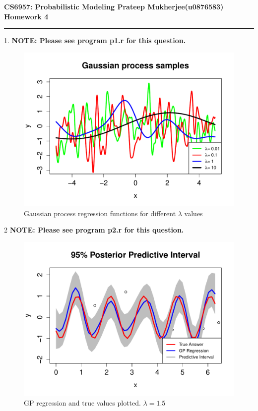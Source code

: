 \documentclass[11pt]{article}
\begin{document}
\thispagestyle{empty}
{\large{\bf CS6957: Probabilistic Modeling \hfill Prateep Mukherjee(u0876583)}}\\

{\LARGE{\bf Homework 4}}
\vspace{0.2\baselineskip}
\hrule

\par 1. \textbf{\large{NOTE: Please see program p1.r for this question.}}

\vspace{-5pt}

\begin{figure}[hbt!]
\centering
\includegraphics[width=0.8\linewidth]{p1.pdf}
\vspace{-25pt}
\caption{Gaussian process regression functions for different $\lambda$ values}
\label{fig1}
\end{figure}


\par 2 \textbf{\large{NOTE: Please see program p2.r for this question.}}

\vspace{-10pt}

\begin{figure}[hbt!]
\centering
\includegraphics[width=0.8\linewidth]{p2.pdf}
\vspace{-25pt}
\caption{GP regression and true values plotted. $\lambda=1.5$}
\label{fig2}
\end{figure}
\end{document}
